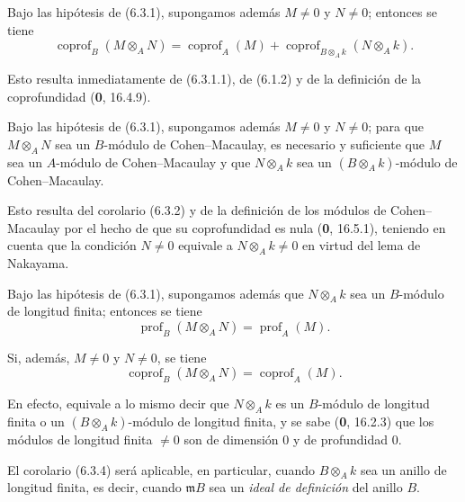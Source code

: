 \begin{corollary}[6.3.2]
\label{IV.2.s6.3.2-fr}
Bajo las hipótesis de \textup{(6.3.1)}, supongamos además $M\neq0$ y $N\neq0$;
entonces se tiene
\begin{equation}
\operatorname{coprof}_B(M\otimes_AN)=\operatorname{coprof}_A(M)
+\operatorname{coprof}_{B\otimes_Ak}(N\otimes_Ak).
\tag{6.3.2.1}\label{IV.2.s6.3.2.1-fr}
\end{equation}
\end{corollary}

Esto resulta inmediatamente de (6.3.1.1), de (6.1.2) y de la definición de la
coprofundidad (\textbf 0, 16.4.9).

\begin{corollary}[6.3.3]
\label{IV.2.s6.3.3-fr}
Bajo las hipótesis de \textup{(6.3.1)}, supongamos además $M\neq0$ y $N\neq0$; para
que $M\otimes_AN$ sea un $B$-módulo de Cohen--Macaulay, es necesario y
suficiente que $M$ sea un $A$-módulo de Cohen--Macaulay y que $N\otimes_Ak$
sea un $(B\otimes_Ak)$-módulo de Cohen--Macaulay.
\end{corollary}

Esto resulta del corolario (6.3.2) y de la definición de los módulos de
Cohen--Macaulay por el hecho de que su coprofundidad es nula (\textbf 0, 16.5.1),
teniendo en cuenta que la condición $N\neq0$ equivale a $N\otimes_Ak\neq0$ en
virtud del lema de Nakayama.

\begin{corollary}[6.3.4]
\label{IV.2.s6.3.4-fr}
Bajo las hipótesis de \textup{(6.3.1)}, supongamos además que $N\otimes_Ak$ sea un
$B$-módulo de longitud finita; entonces se tiene
\begin{equation}
\operatorname{prof}_B(M\otimes_AN)=\operatorname{prof}_A(M).
\tag{6.3.4.1}\label{IV.2.s6.3.4.1-fr}
\end{equation}


Si, además, $M\neq0$ y $N\neq0$, se tiene
\begin{equation}
\operatorname{coprof}_B(M\otimes_AN)=\operatorname{coprof}_A(M).
\tag{6.3.4.2}\label{IV.2.s6.3.4.2-fr}
\end{equation}
\end{corollary}

En efecto, equivale a lo mismo decir que $N\otimes_Ak$ es un $B$-módulo de
longitud finita o un $(B\otimes_Ak)$-módulo de longitud finita, y se sabe
(\textbf 0, 16.2.3) que los módulos de longitud finita $\neq0$ son de dimensión $0$ y
de profundidad $0$.

El corolario (6.3.4) será aplicable, en particular, cuando $B\otimes_Ak$ sea
un anillo de longitud finita, es decir, cuando $\mathfrak mB$ sea un \emph{ideal de
definición} del anillo $B$.
